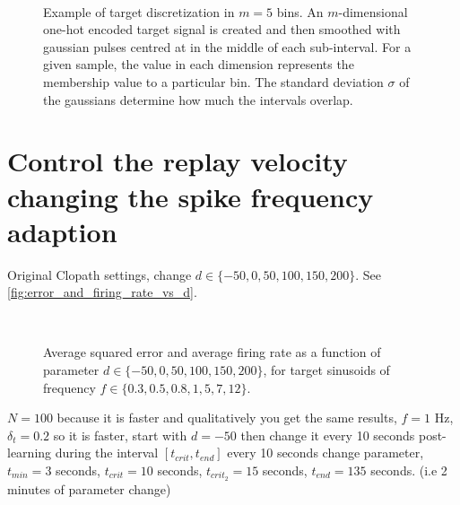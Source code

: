 \documentclass[10pt,a4paper, final]{report} %
\begin{document}

\begin{figure}[H]
\centering
{}
\\
\caption{Example of target discretization in $m=5$ bins. An $m$-dimensional one-hot encoded target signal is created and then smoothed with gaussian pulses centred at in the middle of each sub-interval. For a given sample, the value in each dimension represents the membership value to a particular bin. The standard deviation $\sigma$ of the gaussians determine how much the intervals overlap.}
\label{fig:target_discretization_example}
\end{figure}


\section{Control the replay velocity changing the spike frequency adaption}
Original Clopath settings, change $d \in \{-50, 0, 50, 100, 150, 200 \}$.
See \autoref{fig:error_and_firing_rate_vs_d}.

\begin{figure}[H]
\centering
{}
\\
\caption{Average squared error and average firing rate as a function of parameter $d \in \{-50, 0, 50, 100, 150, 200 \}$, for target sinusoids of frequency $f \in \{0.3, 0.5, 0.8, 1, 5, 7, 12 \}$.}
\label{fig:error_and_firing_rate_vs_d}
\end{figure}



$N = 100$ because it is faster and qualitatively you get the same results,
$f = 1$ Hz,
$\delta_t = 0.2$ so it is faster,
start with $d = -50$ then change it every 10 seconds post-learning during the interval $[t_{crit}, t_{end}]$
every 10 seconds change parameter,
$t_{min} = 3$ seconds, $t_{crit} = 10$ seconds, $t_{crit_2} = 15$ seconds, $t_{end} = 135$ seconds. 
(i.e 2 minutes of parameter change)
\end{document}
